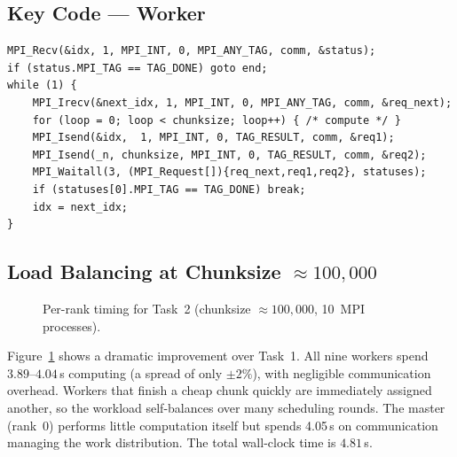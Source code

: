 \documentclass[11pt,a4paper]{article}
\begin{document}
\subsection{Key Code --- Worker}
\begin{lstlisting}
MPI_Recv(&idx, 1, MPI_INT, 0, MPI_ANY_TAG, comm, &status);
if (status.MPI_TAG == TAG_DONE) goto end;
while (1) {
    MPI_Irecv(&next_idx, 1, MPI_INT, 0, MPI_ANY_TAG, comm, &req_next);
    for (loop = 0; loop < chunksize; loop++) { /* compute */ }
    MPI_Isend(&idx,  1, MPI_INT, 0, TAG_RESULT, comm, &req1);
    MPI_Isend(_n, chunksize, MPI_INT, 0, TAG_RESULT, comm, &req2);
    MPI_Waitall(3, (MPI_Request[]){req_next,req1,req2}, statuses);
    if (statuses[0].MPI_TAG == TAG_DONE) break;
    idx = next_idx;
}
\end{lstlisting}

\subsection{Load Balancing at Chunksize $\approx 100{,}000$}

\begin{figure}[h]\centering
{}
\caption{Per-rank timing for Task~2 (chunksize $\approx 100{,}000$, 10~MPI processes).}
\label{fig:task2_timing}
\end{figure}

Figure~\ref{fig:task2_timing} shows a dramatic improvement over Task~1.
All nine workers spend $3.89$--$4.04$\,s computing (a spread of only
$\pm 2\%$), with negligible communication overhead.
Workers that finish a cheap chunk quickly are immediately assigned another,
so the workload self-balances over many scheduling rounds.
The master (rank~0) performs little computation itself but spends 4.05\,s on
communication managing the work distribution.
The total wall-clock time is $4.81$\,s.
\end{document}
